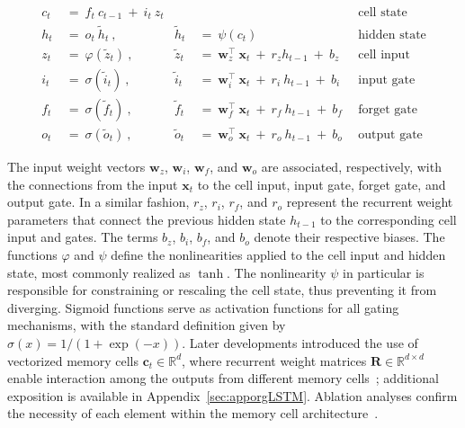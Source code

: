 \begin{align}
c_t \ &= \  f_t \ c_{t-1} \ + \ i_t \ z_t &  & &\text{cell state} \\
h_t  \ &= \ o_t \ \tilde{h}_t \ , & \tilde{h}_t \ &= \ \psi \left( c_t\right)
  &\text{hidden state} \\
z_t \ &= \ \varphi \left( \tilde{z}_t \right) \ , 
  &\tilde{z}_t \ &=  \ \mathbf{w}^\top_{z} \ \mathbf{x}_t \ + \
  r_{z}  h_{t-1} \ + \  b_{z} \ \
  &\text{cell input} \\
i_t \ &= \ \sigma \left( \tilde{i}_t  \right) \ , 
  &\tilde{i}_t \ &= \ \mathbf{w}^\top_{i} \ \mathbf{x}_t \ + \
  r_{i}  \ h_{t-1} \ + \  b_{i} \ \
  &\text{input gate} \\
f_t \ &= \ \sigma \left(  \tilde{f}_t \right) \ , 
  &\tilde{f}_t \ &= \ \mathbf{w}^\top_{f} \ \mathbf{x}_t  \ + \
  r_{f}  \ h_{t-1} \ + \  b_{f} \ \
  &\text{forget gate} \\
o_t \ &= \ \sigma \left( \tilde{o}_t \right) \ , 
  &\tilde{o}_t  \ &= \ \mathbf{w}^\top_{o} \ \mathbf{x}_t \ + \
  r_{o}  \ h_{t-1} \ + \  b_{o} \ \
  &\text{output gate} 
\end{align}

The input weight vectors $\mathbf{w}_{z}$, $\mathbf{w}_{i}$, $\mathbf{w}_{f}$, and $\mathbf{w}_{o}$ are associated, respectively, with the connections from the input $\mathbf{x}_t$ to the cell input, input gate, forget gate, and output gate. In a similar fashion, $r_{z}$, $r_{i}$, $r_{f}$, and $r_{o}$ represent the recurrent weight parameters that connect the previous hidden state $h_{t-1}$ to the corresponding cell input and gates. The terms $b_{z}$, $b_{i}$, $b_{f}$, and $b_{o}$ denote their respective biases. The functions $\varphi$ and $\psi$ define the nonlinearities applied to the cell input and hidden state, most commonly realized as $\tanh$. The nonlinearity $\psi$ in particular is responsible for constraining or rescaling the cell state, thus preventing it from diverging. Sigmoid functions serve as activation functions for all gating mechanisms, with the standard definition given by $\sigma \left( x \right)= 1/(1+\exp(-x))$. Later developments introduced the use of vectorized memory cells $\mathbf{c}_t \in \mathbb{R}^{d}$, where recurrent weight matrices $\mathbf{R} \in \mathbb{R}^{d \times d}$ enable interaction among the outputs from different memory cells~\citep{Greff:15}; additional exposition is available in Appendix~\ref{sec:apporgLSTM}. Ablation analyses confirm the necessity of each element within the memory cell architecture~\citep{Greff:15}.

